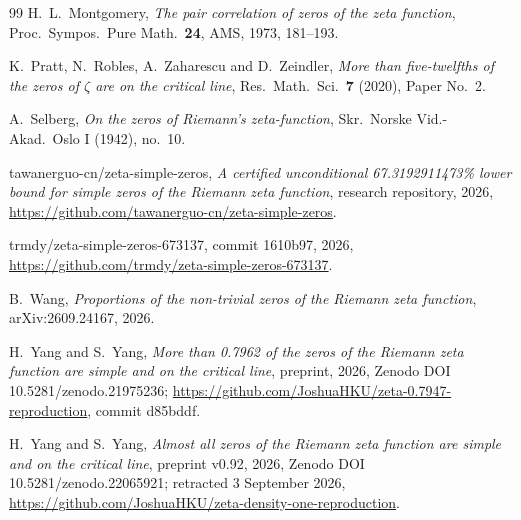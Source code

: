 \documentclass[reqno,11pt]{amsart}
\numberwithin{equation}{section}
\theoremstyle{plain}
\theoremstyle{remark}
\begin{document}
\begin{thebibliography}{99}
 H.~L.~Montgomery, \emph{The pair correlation of zeros of the
zeta function}, Proc.\ Sympos.\ Pure Math.\ \textbf{24}, AMS, 1973, 181--193.

 K.~Pratt, N.~Robles, A.~Zaharescu and D.~Zeindler, \emph{More
than five-twelfths of the zeros of $\zeta$ are on the critical line}, Res.\
Math.\ Sci.\ \textbf{7} (2020), Paper No.~2.

 A.~Selberg, \emph{On the zeros of Riemann's zeta-function},
Skr.\ Norske Vid.-Akad.\ Oslo I (1942), no.~10.

 tawanerguo-cn/zeta-simple-zeros, \emph{A certified
unconditional 67.3192911473\% lower bound for simple zeros of the Riemann
zeta function}, research repository, 2026,
\url{https://github.com/tawanerguo-cn/zeta-simple-zeros}.

 trmdy/zeta-simple-zeros-673137, commit 1610b97, 2026,
\url{https://github.com/trmdy/zeta-simple-zeros-673137}.

 B.~Wang, \emph{Proportions of the non-trivial zeros of the
Riemann zeta function}, arXiv:2609.24167, 2026.

 H.~Yang and S.~Yang, \emph{More than 0.7962 of the zeros of
the Riemann zeta function are simple and on the critical line}, preprint,
2026, Zenodo DOI 10.5281/zenodo.21975236;
\url{https://github.com/JoshuaHKU/zeta-0.7947-reproduction}, commit d85bddf.

 H.~Yang and S.~Yang, \emph{Almost all zeros of the Riemann
zeta function are simple and on the critical line}, preprint v0.92, 2026,
Zenodo DOI 10.5281/zenodo.22065921; retracted 3 September 2026,
\url{https://github.com/JoshuaHKU/zeta-density-one-reproduction}.

\end{thebibliography}
\end{document}
